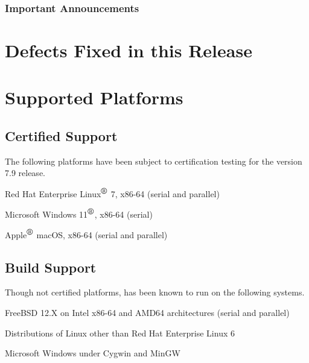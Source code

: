 \documentclass[letterpaper]{scrartcl}
\begin{document}
\subsubsection*{Important Announcements}
\begin{XyceItemize}
\item 
\end{XyceItemize}

\newpage
\section{Defects Fixed in this Release}


\newpage
\section{Supported Platforms}
\subsection*{Certified Support}
The following platforms have been subject to certification testing for the
\Xyce{} version 7.9 release.
\begin{XyceItemize}
  \item Red Hat Enterprise Linux${}^{\mbox{\textregistered}}$ 7, x86-64 (serial and parallel)
  \item Microsoft Windows 11${}^{\mbox{\textregistered}}$, x86-64 (serial)
  \item Apple${}^{\mbox{\textregistered}}$ macOS, x86-64 (serial and parallel)
\end{XyceItemize}


\subsection*{Build Support}
Though not certified platforms, \Xyce{} has been known to run on the following
systems.
\begin{XyceItemize}
  \item FreeBSD 12.X on Intel x86-64 and AMD64 architectures (serial
    and parallel)
  \item Distributions of Linux other than Red Hat Enterprise Linux 6
  \item Microsoft Windows under Cygwin and MinGW
\end{XyceItemize}
\end{document}
